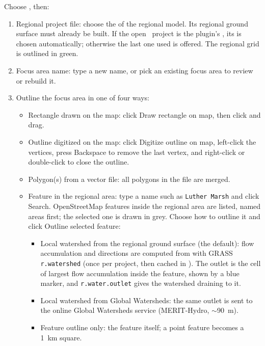         Choose , then:
        \begin{enumerate}
        \item {\sf Regional project file}: choose the  of the regional model.  Its regional ground surface must already be built.  If the open \qgis\ project is the plugin's , its  is chosen automatically; otherwise the last one used is offered.  The regional grid is outlined in green.
        \item {\sf Focus area name}: type a new name, or pick an existing focus area to review or rebuild it.
        \item Outline the focus area in one of four ways:
            \begin{itemize}
            \item {\sf Rectangle drawn on the map}: click {\sf Draw rectangle on map}, then click and drag.
            \item {\sf Outline digitized on the map}: click {\sf Digitize outline on map}, left-click the vertices, press Backspace to remove the last vertex, and right-click or double-click to close the outline.
            \item {\sf Polygon(s) from a vector file}: all polygons in the file are merged.
            \item {\sf Feature in the regional area}: type a name such as {\tt Luther Marsh} and click {\sf Search}.  OpenStreetMap features inside the regional area are listed, named areas first; the selected one is drawn in grey.  Choose how to outline it and click {\sf Outline selected feature}:
                \begin{itemize}
                \item {\sf Local watershed from the regional ground surface} (the default): flow accumulation and directions are computed from  with GRASS {\tt r.watershed} (once per project, then cached in ).  The outlet is the cell of largest flow accumulation inside the feature, shown by a blue marker, and {\tt r.water.outlet} gives the watershed draining to it.
                \item {\sf Local watershed from Global Watersheds}: the same outlet is sent to the online Global Watersheds service (MERIT-Hydro, $\sim$90~m).
                \item {\sf Feature outline only}: the feature itself; a point feature becomes a 1~km square.
                \end{itemize}

\end{itemize}
\end{enumerate}
